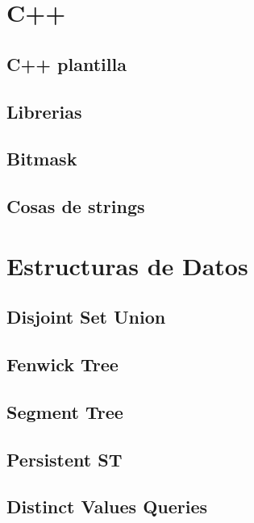 \section{C++}
\subsection{C++ plantilla}
\raggedbottom
\hrulefill
\subsection{Librerias}
\raggedbottom
\hrulefill
\subsection{Bitmask}
\raggedbottom
\hrulefill
\subsection{Cosas de strings}
\raggedbottom
\hrulefill

\section{Estructuras de Datos}
\subsection{Disjoint Set Union}
\raggedbottom
\hrulefill
\subsection{Fenwick Tree}
\raggedbottom
\hrulefill
\subsection{Segment Tree}
\raggedbottom
\hrulefill
\subsection{Persistent ST}
\raggedbottom
\hrulefill
\subsection{Distinct Values Queries}
\raggedbottom
\hrulefill

